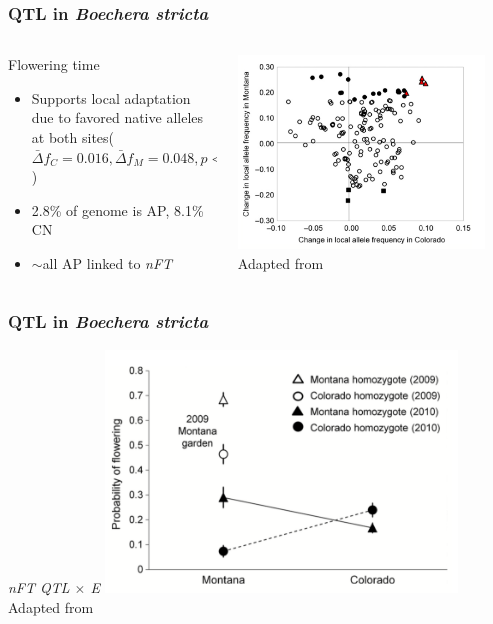 \begin{frame}
\frametitle{QTL in \textit{Boechera stricta}}
\begin{columns}
\begin{column}{0.4\textwidth}
\footnotesize
\begin{block}{Flowering time}
\begin{itemize}
\item{Supports local adaptation due to favored native alleles at 
both sites($\bar{\Delta} f_C = 0.016, \bar{\Delta} f_M = 
0.048, p < 0.001$)}
\item{2.8\% of genome is AP, 8.1\% CN}
\item{$\sim$all AP linked to \textit{nFT}}
\end{itemize}
\end{block}
\end{column}
\begin{column}{0.6\textwidth}
\centering
\includegraphics[width=0.9\textwidth]{boechera.png}\\
\tiny
Adapted from \citet[Figure 1]{Anderson:2012cb}
\end{column}

	
\end{columns}

\end{frame}

\begin{frame}
\frametitle{QTL in \textit{Boechera stricta}}
\begin{block}{\textit{nFT QTL $\times$ E}}
\centering
\includegraphics[width=0.7\textwidth]{boechera2.png}\\
\tiny
Adapted from \citet[Figure 3]{Anderson:2012cb}
\end{block}
\end{frame}

